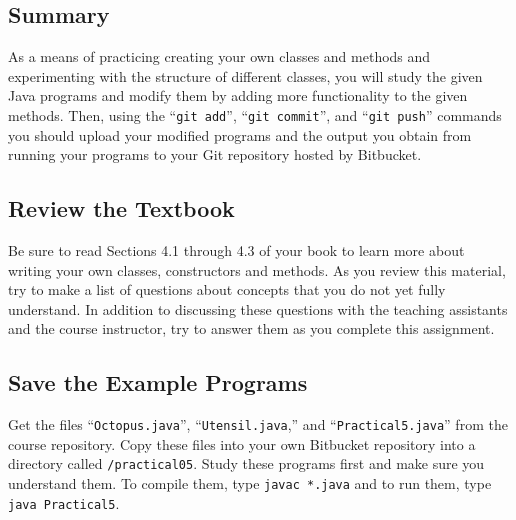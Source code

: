 



\subsection*{Summary}
\vspace*{-.05in}
As a means of practicing creating your own classes and methods and experimenting with the structure of different classes, you will study the given Java programs and modify them by adding more functionality to the given methods.  Then, using the ``{\tt git add}'', ``{\tt git
  commit}'', and ``{\tt git push}'' commands you should upload your modified programs and the output you obtain from running your programs to your Git
repository hosted by Bitbucket.  

\vspace*{-.15in}
\subsection*{Review the Textbook}
\vspace*{-.05in}
Be sure to read Sections 4.1 through 4.3 of your book to learn more about writing your own classes, constructors and methods.  As you review this material, try to make a list of questions about concepts that you do not yet fully
understand.  In addition to discussing these questions with the teaching assistants and the course instructor, try to
answer them as you complete this assignment.

\vspace*{-.15in}
\subsection*{Save the Example Programs}
\vspace*{-.05in}
Get the files ``{\tt Octopus.java}'', ``{\tt Utensil.java},'' and
``{\tt Practical5.java}'' from the course repository. Copy these files 
into your own Bitbucket repository into a directory called {\tt /practical05}. Study 
these programs first and make sure you understand them. To compile them, type
{\tt javac *.java} and to run them, type {\tt java Practical5}.

